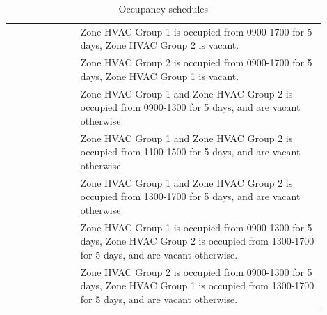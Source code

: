 \begin{table}[t]
\centering
\begin{tabular}{p{0.2\linewidth} p{0.7\linewidth}}
\hline \centering{Schedule Types} & {\centering{Schedule Description}} \tabularnewline       
\hline \centering{S1} & Zone HVAC Group 1 is occupied from 0900-1700 for 5 days, Zone HVAC Group 2 is vacant. \tabularnewline
\hline \centering{S2} & Zone HVAC Group 2 is occupied from 0900-1700 for 5 days, Zone HVAC Group 1 is vacant. \tabularnewline
\hline \centering{S3} & Zone HVAC Group 1 and Zone HVAC Group 2 is occupied from 0900-1300 for 5 days, and are vacant otherwise. \tabularnewline
\hline \centering{S4} & Zone HVAC Group 1 and Zone HVAC Group 2 is occupied from 1100-1500 for 5 days, and are vacant otherwise. \tabularnewline
\hline \centering{S5} & Zone HVAC Group 1 and Zone HVAC Group 2 is occupied from 1300-1700 for 5 days, and are vacant otherwise. \tabularnewline
\hline \centering{S6} & Zone HVAC Group 1 is occupied from 0900-1300 for 5 days, Zone HVAC Group 2 is occupied from 1300-1700 for 5 days, and are vacant otherwise. \tabularnewline
\hline \centering{S7} & Zone HVAC Group 2 is occupied from 0900-1300 for 5 days, Zone HVAC Group 1 is occupied from 1300-1700 for 5 days, and are vacant otherwise. \tabularnewline
\end{tabular}
	\caption{Occupancy schedules}
	\label{tab:app_sche}
\end{table}

